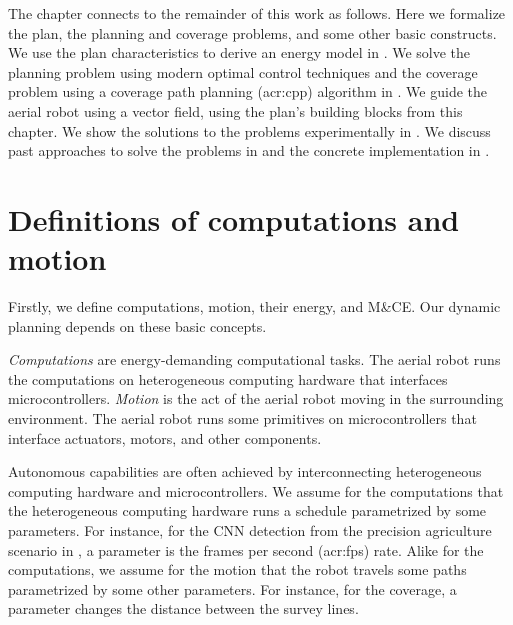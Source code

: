 The chapter connects to the remainder of this work as follows. Here we formalize the plan, the planning and coverage problems, and some other basic constructs. We use the plan characteristics to derive an energy model in . We solve the planning problem using modern optimal control techniques and the coverage problem using a coverage path planning (\Gls{acr:cpp}) algorithm in . We guide the aerial robot using a vector field, using the plan's building blocks from this chapter. We show the solutions to the problems experimentally in . We discuss past approaches to solve the problems in  and the concrete implementation in .





\section{Definitions of computations and motion}
\label{sec:definitions}

Firstly, we define computations, motion, their energy, and M\&CE. Our dynamic planning depends on these basic concepts.

\begin{defn}
  \label{def:comps}
  \emph{Computations} are energy-demanding computational tasks. The aerial robot runs the computations on heterogeneous computing hardware that interfaces microcontrollers.
  \emph{Motion} is the act of the aerial robot moving in the surrounding environment. The aerial robot runs some primitives on microcontrollers that interface actuators, motors, and other components.
\end{defn}

Autonomous capabilities are often achieved by interconnecting heterogeneous computing hardware and microcontrollers. We assume for the computations that the heterogeneous computing hardware runs a schedule parametrized by some parameters. For instance, for the CNN detection from the precision agriculture scenario in , a parameter is the frames per second (\Gls{acr:fps}) rate. Alike for the computations, we assume for the motion that the robot travels some paths parametrized by some other parameters. For instance, for the coverage, a parameter changes the distance between the survey lines.

